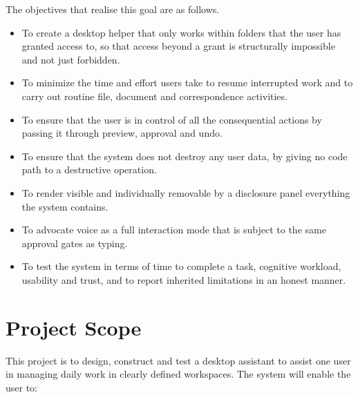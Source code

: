 \documentclass{FastFyp}
\begin{document}
The objectives that realise this goal are as follows.

\begin{itemize}
    \item To create a desktop helper that only works within folders that the user has granted access to, so that access beyond a grant is structurally impossible and not just forbidden.
    \item To minimize the time and effort users take to resume interrupted work and to carry out routine file, document and correspondence activities.
    \item To ensure that the user is in control of all the consequential actions by passing it through preview, approval and undo.
    \item To ensure that the system does not destroy any user data, by giving no code path to a destructive operation.
    \item To render visible and individually removable by a disclosure panel everything the system contains.
    \item To advocate voice as a full interaction mode that is subject to the same approval gates as typing.
    \item To test the system in terms of time to complete a task, cognitive workload, usability and trust, and to report inherited limitations in an honest manner.
\end{itemize}

\section{Project Scope}
This project is to design, construct and test a desktop assistant to assist one user in managing daily work in clearly defined workspaces. The system will enable the user to:
\end{document}
